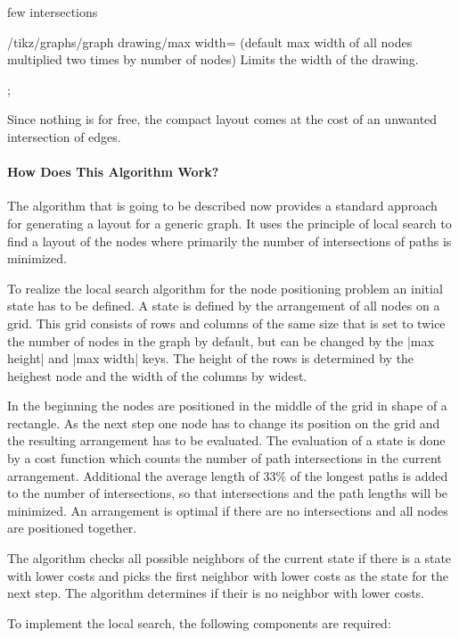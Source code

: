 \begin{gdalgorithm}{few intersections}
\begin{key}{/tikz/graphs/graph drawing/max width= (default max width of all nodes multiplied two times by number of nodes)}
Limits the width of the drawing.
\begin{codeexample}[]
\tikz [graph drawing={few intersections, max width=50pt, max height=50pt},
              scale=2]
  ;
\end{codeexample}
Since nothing is for free, the compact layout comes at the cost of an unwanted intersection of edges.
\end{key}

\paragraph{How Does This Algorithm Work?}
The algorithm that is going to be described now provides a standard approach for generating a layout for a generic graph.
It uses the principle of local search to find a layout of the nodes where primarily the number of intersections of paths is minimized.
\par To realize the local search algorithm for the node positioning problem an initial state has to be defined. A state is defined by the arrangement of all nodes on a grid. This grid consists of rows and columns of the same size that is set to twice the number of nodes in the graph by default, but can be changed by the |max height| and |max width| keys. The height of the rows is determined by the heighest node and the width of the columns by widest.
\par In the beginning the nodes are positioned in the middle of the grid in shape of a rectangle. As the next step one node has to change its position on the grid and the resulting arrangement has to be evaluated. The evaluation of a state is done by a cost function which counts the number of path intersections in the current arrangement. Additional the average length of 33\% of the longest paths is added to the number of intersections, so that intersections and the path lengths will be minimized. An arrangement is optimal if there are no intersections and all nodes are positioned together. 
\par The algorithm checks all possible neighbors of the current state if there is a state with lower costs and picks the first neighbor with lower costs as the state for the next step. The algorithm determines if their is no neighbor with lower costs.
\par To implement the local search, the following components are required:

\end{gdalgorithm}
